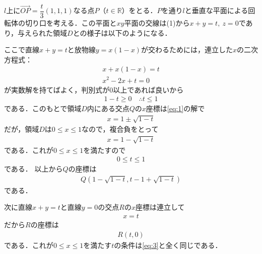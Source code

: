 \documentclass[../../main.tex]{subfiles}
\begin{document}
$l$上に$\overrightarrow{OP}=\dfrac{t}{3}(1,1,1)$なる点$P$（$t\in\mathbb R$）をとる．$P$を通り$l$と垂直な平面による回転体の切り口を考える．この平面と$xy$平面の交線は(1)から$x+y=t,\ z=0$であり，与えられた領域$D$との様子は以下のようになる．

ここで直線$x+y=t$と放物線$y=x(1-x)$が交わるためには，連立した$x$の二次方程式：
\begin{align}
  x + x(1-x) = t \\
  x^2 -2x +t = 0 \label{eq:1}
\end{align}
が実数解を持てばよく，判別式が$0$以上であれば良いから
\begin{align}
  1-t \ge 0 \quad \therefore t \le 1 \label{eq:2}
\end{align}
である．このもとで領域$D$内にある交点$Q$の$x$座標は\cref{eq:1}の解で
\begin{align}
  x = 1 \pm\sqrt{1-t}
\end{align}
だが，領域$D$は$0 \le x \le 1$なので，複合負をとって
\begin{align}
  x = 1 - \sqrt{1-t}
\end{align}
である．これが$0 \le x \le 1$を満たすので
\begin{align}
  0 \le t \le 1 \label{eq:3}
\end{align}
である．
以上から$Q$の座標は
\begin{align}
  Q(1-\sqrt{1-t}, t-1 + \sqrt{1-t})\label{eq:4}
\end{align}
である．

次に直線$x+y=t$と直線$y=0$の交点$R$の$x$座標は連立して
\begin{align}
  x = t
\end{align}
だから$R$の座標は
\begin{align}
  R(t,0) \label{eq:5}
\end{align}
である．これが$0\le x \le 1$を満たす$t$の条件は\cref{eq:3}と全く同じである．
\end{document}
